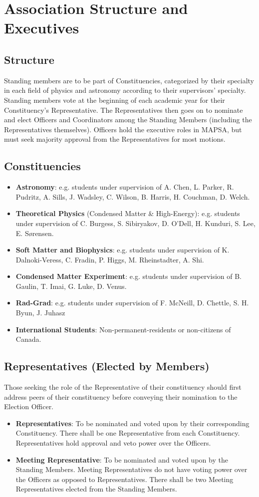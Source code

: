 \documentclass[8pt]{article}
\begin{document}
	\section{Association Structure and Executives}
	\subsection{Structure}
	Standing members are to be part of Constituencies, categorized by their specialty in each field of physics and astronomy according to their supervisors' specialty. Standing members vote at the beginning of each academic year for their Constituency's Representative. The Representatives then goes on to nominate and elect Officers and Coordinators among the Standing Members (including the Representatives themselves). Officers hold the executive roles in MAPSA, but must seek majority approval from the Representatives for most motions. 
	\subsection{Constituencies}
	\begin{itemize}
		\item \textbf{Astronomy}: e.g. students under supervision of A. Chen, L. Parker, R. Pudritz, A. Sills, J. Wadsley, C. Wilson, B. Harris, H. Couchman, D. Welch.
		\item \textbf{Theoretical Physics} (Condensed Matter \& High-Energy): e.g. students under supervision of C. Burgess, S. Sibiryakov, D. O'Dell, H. Kunduri, S. Lee, E. Sørensen.
		\item \textbf{Soft Matter and Biophysics}: e.g. students under supervision of K. Dalnoki-Veress, C. Fradin, P. Higgs, M. Rheinstadter, A. Shi.
		\item \textbf{Condensed Matter Experiment}: e.g. students under supervision of B. Gaulin, T. Imai, G. Luke, D. Venus.
		\item \textbf{Rad-Grad}: e.g. students under supervision of F. McNeill, D. Chettle, S. H. Byun, J. Juhasz
		\item \textbf{International Students}: Non-permanent-residents or non-citizens of Canada.
	\end{itemize}
	
	\subsection{Representatives (Elected by Members)}
	Those seeking the role of the Representative of their constituency should first address peers of their constituency before conveying their nomination to the Election Officer. 
	\begin{itemize}
		\item \textbf{Representatives}: To be nominated and voted upon by their corresponding Constituency. There shall be one Representative from each Constituency. Representatives hold approval and veto power over the Officers.
		\item \textbf{Meeting Representative}: To be nominated and voted upon by the Standing Members. Meeting Representatives do not have voting power over the Officers as opposed to Representatives. There shall be two Meeting Representatives elected from the Standing Members.
	\end{itemize}
\end{document}
